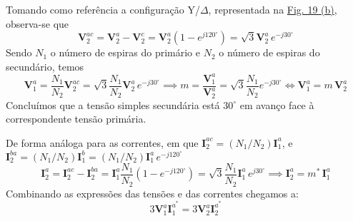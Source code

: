 \begin{mdframed}
    Tomando como referência a configuração Y/$\Delta$, representada na \hyperref[fig:tipos-ligacao-transformador-trifasico]{Fig. 19 (b)}, observa-se que
    $$
        \mathbf{V}^{ac}_2 = \mathbf{V}^{a}_2 - \mathbf{V}^{c}_2 = \mathbf{V}^{a}_2 (1-e^{j120^{\circ}}) = \sqrt{3} \mathbf{V}^{a}_2\, e^{-j30^{\circ}}
    $$
    Sendo $N_1$ o número de espiras do primário e $N_2$ o número de espiras do secundário, temos 
    $$
        \mathbf{V}^{a}_{1} = \frac{N_1}{N_2} \mathbf{V}^{ac}_{2} = \sqrt{3} \frac{N_1}{N_2} \mathbf{V}^{a}_2\, e^{-j30^{\circ}} 
        \implies
        m = \frac{\mathbf{V}^{a}_1}{\mathbf{V}^{a}_2} = \sqrt{3} \frac{N_1}{N_2} e^{-j30^{\circ}} \iff \boxed{\mathbf{V}^{a}_1 = m\, \mathbf{V}^{a}_2}
    $$
    Concluímos que a tensão simples secundária está $30^{\circ}$ em avanço face à correspondente tensão primária.

    De forma análoga para as correntes, em que $\mathbf{I}^{ac}_2 = (N_1/N_2) \mathbf{I}^{a}_1$, e $\mathbf{I}^{ba}_2 = (N_1/N_2) \mathbf{I}^{b}_1 = (N_1/N_2) \mathbf{I}^{a}_1\, e^{-j120^{\circ}}$
    $$
        \mathbf{I}^{a}_2 = \mathbf{I}^{ac}_2 - \mathbf{I}^{ba}_2 = \mathbf{I}^{a}_1 \frac{N_1}{N_2} (1-e^{-j120^{\circ}}) = \sqrt{3} \frac{N_1}{N_2} \mathbf{I}^{a}_1\, e^{j30^{\circ}}
        \implies
        \boxed{\mathbf{I}^{a}_2 = m^*\, \mathbf{I}^{a}_1}
    $$
    Combinando as expressões das tensões e das correntes chegamos a:
    $$
        \boxed{3 \mathbf{V}^{a}_1\mathbf{I}^{a^*}_1 = 3 \mathbf{V}^{a}_2\mathbf{I}^{a^*}_2}
    $$
\end{mdframed}

